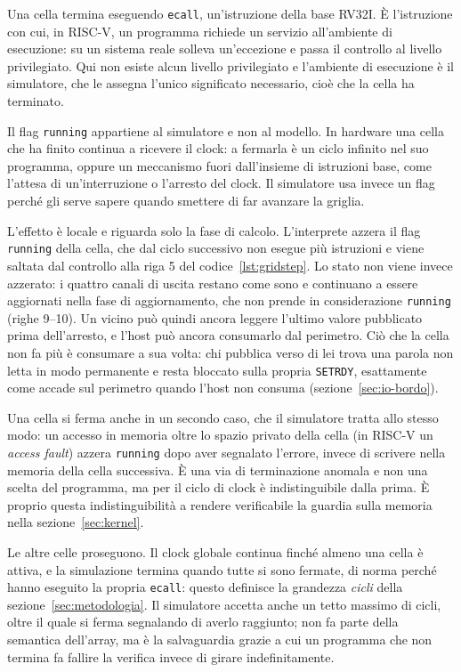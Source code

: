 Una cella termina eseguendo \texttt{ecall}, un'istruzione della base RV32I. È
l'istruzione con cui, in RISC-V, un programma richiede un servizio all'ambiente di esecuzione: su un sistema
reale solleva un'eccezione e passa il controllo al livello privilegiato. Qui
non esiste alcun livello privilegiato e l'ambiente di esecuzione è il
simulatore, che le assegna l'unico significato necessario, cioè che la cella ha
terminato.

Il flag \texttt{running} appartiene al simulatore e non al modello. In hardware
una cella che ha finito continua a ricevere il clock: a fermarla è un ciclo
infinito nel suo programma, oppure un meccanismo fuori dall'insieme di
istruzioni base, come l'attesa di un'interruzione o l'arresto del clock. Il
simulatore usa invece un flag perché gli serve sapere quando smettere di far
avanzare la griglia.

L'effetto è locale e riguarda solo la fase di calcolo. L'interprete azzera il
flag \texttt{running} della cella, che dal ciclo successivo non esegue più
istruzioni e viene saltata dal controllo alla riga 5 del
codice~\ref{lst:gridstep}. Lo stato non viene invece azzerato: i quattro canali
di uscita restano come sono e continuano a essere aggiornati nella fase di
aggiornamento, che non prende in considerazione \texttt{running} (righe 9--10). Un
vicino può quindi ancora leggere l'ultimo valore pubblicato prima dell'arresto,
e l'host può ancora consumarlo dal perimetro. Ciò che la cella non fa più è
consumare a sua volta: chi pubblica verso di lei trova una parola non letta in
modo permanente e resta bloccato sulla propria \texttt{SETRDY}, esattamente come
accade sul perimetro quando l'host non consuma (sezione~\ref{sec:io-bordo}).

Una cella si ferma anche in un secondo caso, che il simulatore tratta allo
stesso modo: un accesso in memoria oltre lo spazio privato della cella (in
RISC-V un \emph{access fault}) azzera \texttt{running}
dopo aver segnalato l'errore, invece di scrivere nella memoria della cella
successiva. È una via di terminazione anomala e non una scelta del programma,
ma per il ciclo di clock è indistinguibile dalla prima. È proprio questa
indistinguibilità a rendere verificabile la guardia sulla memoria nella
sezione~\ref{sec:kernel}.

Le altre celle proseguono. Il clock globale continua finché almeno una cella è attiva, e la simulazione termina quando tutte si sono fermate, di norma perché
hanno eseguito la propria \texttt{ecall}: questo definisce la grandezza
\emph{cicli} della sezione~\ref{sec:metodologia}. Il simulatore accetta anche un tetto massimo di
cicli, oltre il quale si ferma segnalando di averlo raggiunto; non fa parte
della semantica dell'array, ma è la salvaguardia grazie a cui un programma che
non termina fa fallire la verifica invece di girare indefinitamente.

